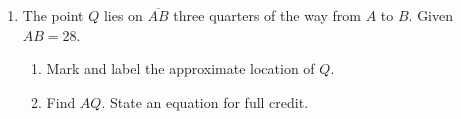\begin{enumerate}
\item The point $Q$ lies on $\overline{AB}$ three quarters of the way from $A$ to $B$. Given $AB=28$.
    \begin{enumerate}
      \item Mark and label the approximate location of $Q$.
      \item Find ${AQ}$. State an equation for full credit.
    \end{enumerate} \vspace{1cm} 
    \begin{center}
    \end{center} \vspace{3cm} 

\end{enumerate}
